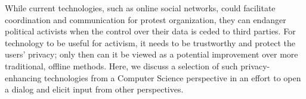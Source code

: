 
While current technologies, such as online social networks, could
facilitate coordination and communication for protest organization,
they can endanger political activists when the control over their data
is ceded to third parties. For technology to be useful for activism,
it needs to be trustworthy and protect the users' privacy; only then
can it be viewed as a potential improvement over more traditional,
offline methods. Here, we discuss a selection of such
privacy-enhancing technologies from a Computer Science perspective in
an effort to open a dialog and elicit input from other perspectives.


